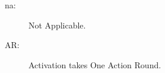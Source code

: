 \begin{table}[htbp]
{\begin{minipage}{5in}
      \medskip

      \parbox{\textwidth}{\begin{description}
        \item[na:] Not Applicable. 
        \item[AR:] Activation takes One Action Round. 
        \end{description}}
    \end{minipage}}
\end{table}


